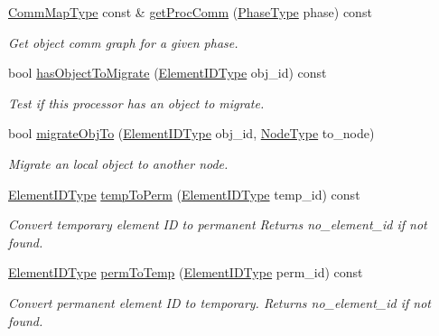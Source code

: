 \begin{DoxyCompactItemize}
\hyperlink{namespacevt_1_1vrt_1_1collection_1_1balance_aa50d4cbbfa3c643e7303fc6e08f411fb}{Comm\+Map\+Type} const  \& \hyperlink{structvt_1_1vrt_1_1collection_1_1balance_1_1_proc_stats_ad8cda5635a21134657595fd34dca1f6a}{get\+Proc\+Comm} (\hyperlink{namespacevt_a46ce6733d5cdbd735d561b7b4029f6d7}{Phase\+Type} phase) const
\begin{DoxyCompactList}\small\item\em Get object comm graph for a given phase. \end{DoxyCompactList}\item 
bool \hyperlink{structvt_1_1vrt_1_1collection_1_1balance_1_1_proc_stats_a8ee38def0f38270f9b3dbbae19b027ce}{has\+Object\+To\+Migrate} (\hyperlink{namespacevt_1_1vrt_1_1collection_1_1balance_a14c8d2c972f2913aa3f1636e5be0a120}{Element\+I\+D\+Type} obj\+\_\+id) const
\begin{DoxyCompactList}\small\item\em Test if this processor has an object to migrate. \end{DoxyCompactList}\item 
bool \hyperlink{structvt_1_1vrt_1_1collection_1_1balance_1_1_proc_stats_ad8a4cff0e1259002ed45b5c8f1b43d26}{migrate\+Obj\+To} (\hyperlink{namespacevt_1_1vrt_1_1collection_1_1balance_a14c8d2c972f2913aa3f1636e5be0a120}{Element\+I\+D\+Type} obj\+\_\+id, \hyperlink{namespacevt_a866da9d0efc19c0a1ce79e9e492f47e2}{Node\+Type} to\+\_\+node)
\begin{DoxyCompactList}\small\item\em Migrate an local object to another node. \end{DoxyCompactList}\item 
\hyperlink{namespacevt_1_1vrt_1_1collection_1_1balance_a14c8d2c972f2913aa3f1636e5be0a120}{Element\+I\+D\+Type} \hyperlink{structvt_1_1vrt_1_1collection_1_1balance_1_1_proc_stats_afed5b2ba3c677167d38ae12c012ff993}{temp\+To\+Perm} (\hyperlink{namespacevt_1_1vrt_1_1collection_1_1balance_a14c8d2c972f2913aa3f1636e5be0a120}{Element\+I\+D\+Type} temp\+\_\+id) const
\begin{DoxyCompactList}\small\item\em Convert temporary element ID to permanent Returns {\ttfamily no\+\_\+element\+\_\+id} if not found. \end{DoxyCompactList}\item 
\hyperlink{namespacevt_1_1vrt_1_1collection_1_1balance_a14c8d2c972f2913aa3f1636e5be0a120}{Element\+I\+D\+Type} \hyperlink{structvt_1_1vrt_1_1collection_1_1balance_1_1_proc_stats_a5b3d280cadc1a2d06de37b5d2da41ba8}{perm\+To\+Temp} (\hyperlink{namespacevt_1_1vrt_1_1collection_1_1balance_a14c8d2c972f2913aa3f1636e5be0a120}{Element\+I\+D\+Type} perm\+\_\+id) const
\begin{DoxyCompactList}\small\item\em Convert permanent element ID to temporary. Returns {\ttfamily no\+\_\+element\+\_\+id} if not found. \end{DoxyCompactList}\end{DoxyCompactItemize}
